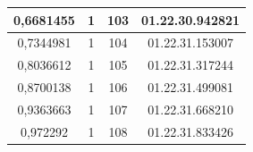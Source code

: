 \begin{table}[]
\begin{tabular}{|c|c|c|c|}
0,6681455                        & 1                              & 103                     & 01.22.30.942821            \\ \hline
0,7344981                        & 1                              & 104                     & 01.22.31.153007            \\ \hline
0,8036612                        & 1                              & 105                     & 01.22.31.317244            \\ \hline
0,8700138                        & 1                              & 106                     & 01.22.31.499081            \\ \hline
0,9363663                        & 1                              & 107                     & 01.22.31.668210            \\ \hline
0,972292                         & 1                              & 108                     & 01.22.31.833426            \\ \hline
\end{tabular}
\end{table}

